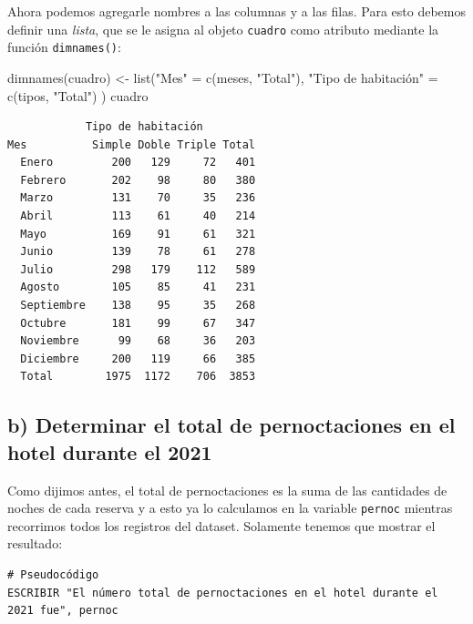 \documentclass[
]{book}
\newenvironment{Shaded}{\begin{snugshade}}{\end{snugshade}}
\newcommand{\FunctionTok}[1]{\textcolor[rgb]{0.00,0.00,0.00}{#1}}
\newcommand{\NormalTok}[1]{#1}
\newcommand{\OtherTok}[1]{\textcolor[rgb]{0.56,0.35,0.01}{#1}}
\newcommand{\StringTok}[1]{\textcolor[rgb]{0.31,0.60,0.02}{#1}}
\begin{document}
Ahora podemos agregarle nombres a las columnas y a las filas. Para esto debemos definir una \emph{lista}, que se le asigna al objeto \texttt{cuadro} como atributo mediante la función \texttt{dimnames()}:

\begin{Shaded}
\begin{Highlighting}[]
\FunctionTok{dimnames}\NormalTok{(cuadro) }\OtherTok{\textless{}{-}} \FunctionTok{list}\NormalTok{(}\StringTok{"Mes"} \OtherTok{=} \FunctionTok{c}\NormalTok{(meses, }\StringTok{"Total"}\NormalTok{), }
                         \StringTok{"Tipo de habitación"} \OtherTok{=} \FunctionTok{c}\NormalTok{(tipos, }\StringTok{"Total"}\NormalTok{) )}
\NormalTok{cuadro}
\end{Highlighting}
\end{Shaded}

\begin{verbatim}
            Tipo de habitación
Mes          Simple Doble Triple Total
  Enero         200   129     72   401
  Febrero       202    98     80   380
  Marzo         131    70     35   236
  Abril         113    61     40   214
  Mayo          169    91     61   321
  Junio         139    78     61   278
  Julio         298   179    112   589
  Agosto        105    85     41   231
  Septiembre    138    95     35   268
  Octubre       181    99     67   347
  Noviembre      99    68     36   203
  Diciembre     200   119     66   385
  Total        1975  1172    706  3853
\end{verbatim}

\hypertarget{b-determinar-el-total-de-pernoctaciones-en-el-hotel-durante-el-2021}{%
\subsection{b) Determinar el total de pernoctaciones en el hotel durante el 2021}\label{b-determinar-el-total-de-pernoctaciones-en-el-hotel-durante-el-2021}}

Como dijimos antes, el total de pernoctaciones es la suma de las cantidades de noches de cada reserva y a esto ya lo calculamos en la variable \texttt{pernoc} mientras recorrimos todos los registros del dataset. Solamente tenemos que mostrar el resultado:

\begin{verbatim}
# Pseudocódigo
ESCRIBIR "El número total de pernoctaciones en el hotel durante el 2021 fue", pernoc
\end{verbatim}
\end{document}
